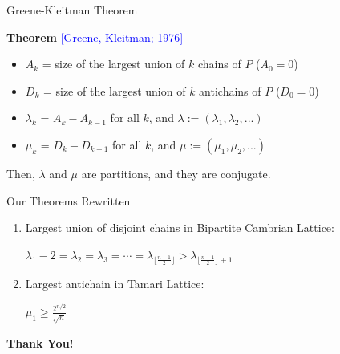 \documentclass[xcolor=x11names,compress,t]{beamer}
\begin{document}
\begin{frame}{Greene-Kleitman Theorem}
    \vspace{0.5cm}
    
    \textbf{Theorem} \textcolor{blue}{[Greene, Kleitman; 1976]}
     \begin{itemize}
         \item $A_k$ = size of the largest union of $k$ chains of $P$ ($A_0 = 0$) 
         \item $D_k$ = size of the largest union of $k$ antichains of $P$ ($D_0 = 0$)
         \item $\lambda_k$ = $A_{k} - A_{k-1}$ for all $k$, and $\lambda := (\lambda_1, \lambda_2,...)$
         \item $\mu_k$ = $D_{k} - D_{k-1}$ for all $k$, and $\mu := (\mu_1, \mu_2,...)$
     \end{itemize}
     Then, $\lambda$ and $\mu$ are partitions, and they are conjugate.
 \end{frame}

\begin{frame}{Our Theorems Rewritten}
    \vspace{1cm}
    \begin{enumerate}
        \item Largest union of disjoint chains in Bipartite Cambrian Lattice: 
        \begin{center} \Large
            $\lambda_1 - 2 = \lambda_2 = \lambda_3 = \cdots = \lambda_{\lfloor\frac{n-1}{2}\rfloor} > \lambda_{\lfloor\frac{n-1}{2}\rfloor + 1}$
        \end{center}
    
    \vspace{0.5cm}
    
        \item Largest antichain in Tamari Lattice:
        \vspace{0.3cm}
        \begin{center}
           \Large $\mu_1 \ge \frac{2^{n/2}}{\sqrt{n}}$
        \end{center}
    \end{enumerate}
\end{frame}

\begin{frame}

    \vspace{1 cm}

    \begin{center}
        \Huge
        \textbf{Thank You!}\\
    \end{center}
\end{frame}

%     
\end{document}
